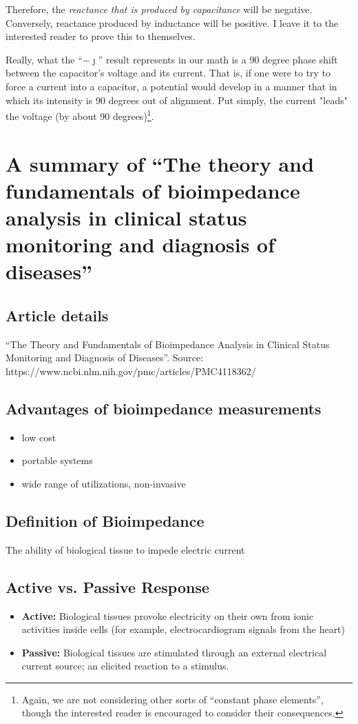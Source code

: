 \documentclass[11pt]{book}
\begin{document}
Therefore, the \textit{reactance that is produced by capacitance} will be negative. Conversely, reactance produced by inductance will be positive. I leave it to the interested reader to prove this to themselves.

Really, what the ``$-\jmath$'' result represents in our math is a 90 degree phase shift between the capacitor's voltage and its current. That is, if one were to try to force a current into a capacitor, a potential would develop in a manner that in which its intensity is 90 degrees out of alignment. Put simply, the current "leads" the voltage (by about 90 degrees)\footnote{Again, we are not considering other sorts of ``constant phase elements'', though the interested reader is encouraged to consider their consequences.}.

\section{A summary of ``The theory and fundamentals of bioimpedance analysis in clinical status monitoring and diagnosis of diseases''}

\subsection{Article details}
“The Theory and Fundamentals of Bioimpedance Analysis in Clinical Status Monitoring and Diagnosis of Diseases”. Source: https://www.ncbi.nlm.nih.gov/pmc/articles/PMC4118362/ 

\subsection{Advantages of bioimpedance measurements}
\begin{itemize}
	\item low cost
	\item portable systems
	\item wide range of utilizations, non-invasive
\end{itemize}


\subsection{Definition of Bioimpedance} 
The ability of biological tissue to impede electric current

\subsection{Active vs. Passive Response}
\begin{itemize}
	\item \textbf{Active:} Biological tissues provoke electricity on their own from ionic activities inside cells (for example, electrocardiogram signals from the heart)
	\item \textbf{Passive:} Biological tissues are stimulated through an external electrical current source; an elicited reaction to a stimulus.
\end{itemize}
\end{document}
